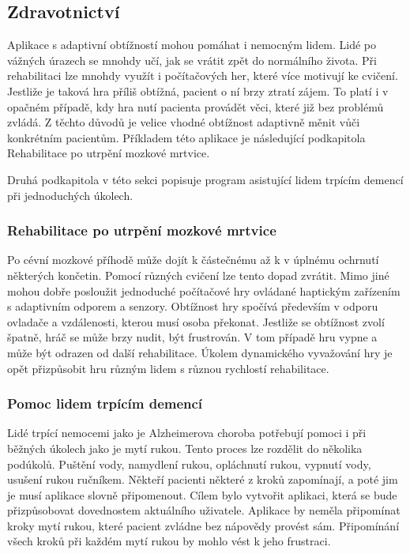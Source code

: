 \subsection{Zdravotnictví}

Aplikace s adaptivní obtížností mohou pomáhat i nemocným lidem. Lidé po vážných úrazech se mnohdy učí, jak se vrátit zpět do normálního života. Při rehabilitaci lze mnohdy využít i počítačových her, které více motivují ke cvičení. Jestliže je taková hra příliš obtížná, pacient o ní brzy ztratí zájem. To platí i v opačném případě, kdy hra nutí pacienta provádět věci, které již bez problémů zvládá. Z těchto důvodů je velice vhodné obtížnost adaptivně měnit vůči konkrétním pacientům. Příkladem této aplikace je následující podkapitola Rehabilitace po utrpění mozkové mrtvice.

Druhá podkapitola v této sekci popisuje program asistující lidem trpícím demencí při jednoduchých úkolech.

\subsubsection{Rehabilitace po utrpění mozkové mrtvice}

Po cévní mozkové příhodě může dojít k částečnému až k v úplnému ochrnutí některých končetin. Pomocí různých cvičení lze tento dopad zvrátit. Mimo jiné mohou dobře posloužit jednoduché počítačové hry ovládané haptickým zařízením s adaptivním odporem a senzory. Obtížnost hry spočívá především v odporu ovladače a vzdálenosti, kterou musí osoba překonat. Jestliže se obtížnost zvolí špatně, hráč se může brzy nudit, být frustrován. V tom případě hru vypne a může být odrazen od další rehabilitace. Úkolem dynamického vyvažování hry je opět přizpůsobit hru různým lidem s různou rychlostí rehabilitace. \cite{9Pomdp} 

\subsubsection{Pomoc lidem trpícím demencí}

Lidé trpící nemocemi jako je Alzheimerova choroba potřebují pomoci i při běžných úkolech jako je mytí rukou. Tento proces lze rozdělit do několika podúkolů. Puštění vody, namydlení rukou, opláchnutí rukou, vypnutí vody, usušení rukou ručníkem. Někteří pacienti některé z kroků zapomínají, a poté jim je musí aplikace slovně připomenout. Cílem bylo vytvořit aplikaci, která se bude přizpůsobovat dovednostem aktuálního uživatele. Aplikace by neměla připomínat kroky mytí rukou, které pacient zvládne bez nápovědy provést sám. Připomínání všech kroků při každém mytí rukou by mohlo vést k jeho frustraci. \cite{10Dementia} 

